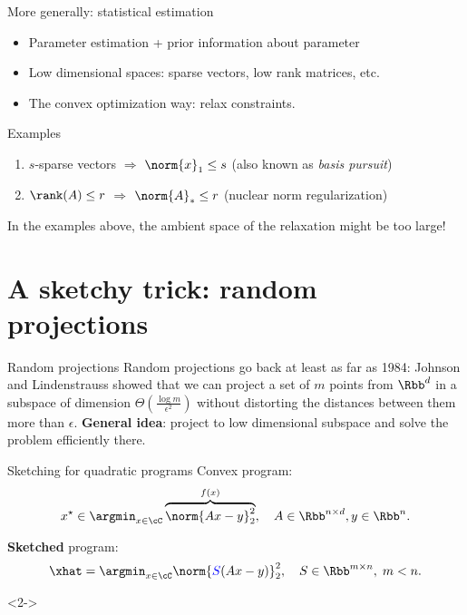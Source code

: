 \documentclass[11pt]{beamer}
\newcommand{\xstar}{x^{\star}}
\begin{document}
\begin{frame}{More generally: statistical estimation}
    \begin{itemize}
    \item Parameter estimation + prior information about parameter
    \item Low dimensional spaces: sparse vectors, low rank matrices, etc.
    \item The convex optimization way: relax constraints.
    \end{itemize}
    \begin{block}{Examples}
        \begin{enumerate}
            \item $s$-sparse vectors $\Rightarrow$ $\norm{x}_{1} \leq s$
            (also known as \textit{basis pursuit}) \\
            \item $\rank(A) \leq r$ $\Rightarrow$ $\norm{A}_{*} \leq r$
            (nuclear norm regularization)
        \end{enumerate}
    \end{block}
    In the examples above, the ambient space of the relaxation might be
    too large!
\end{frame}

\section{A sketchy trick: random projections}
\begin{frame}{Random projections}
    Random projections go back at least as far as 1984: Johnson and
    Lindenstrauss showed that we can project a set of $m$ points from $\Rbb^d$
    in a subspace of dimension $\Theta\left( \frac{\log m}{\epsilon^2} \right)$
    without distorting the distances between them more than $\epsilon$.
    \linebreak[2]
    \textbf{General idea}: project to low dimensional subspace and solve the
    problem efficiently there.
\end{frame}

\begin{frame}{Sketching for quadratic programs}
    Convex program:
    \[
        \xstar \in \argmin_{x \in \cC} \overbrace{\norm{Ax - y}_2^2}^{f(x)},
        \quad A \in \Rbb^{n \times d}, y \in \Rbb^n.
    \]

    \textbf{Sketched} program:
    \[
        \xhat = \argmin_{x \in \cC} \norm{{\color{blue} S}(Ax - y)}_2^2,
        \quad S \in \Rbb^{m \times n}, \; m < n.
    \]

    \only{\textbf{\color{red} Question:}
    \[
        m \geq \; ??? \Rightarrow f(\xhat) \leq (1 + \delta)^2 f(\xstar)
    \]}<2->
\end{frame}
\end{document}
